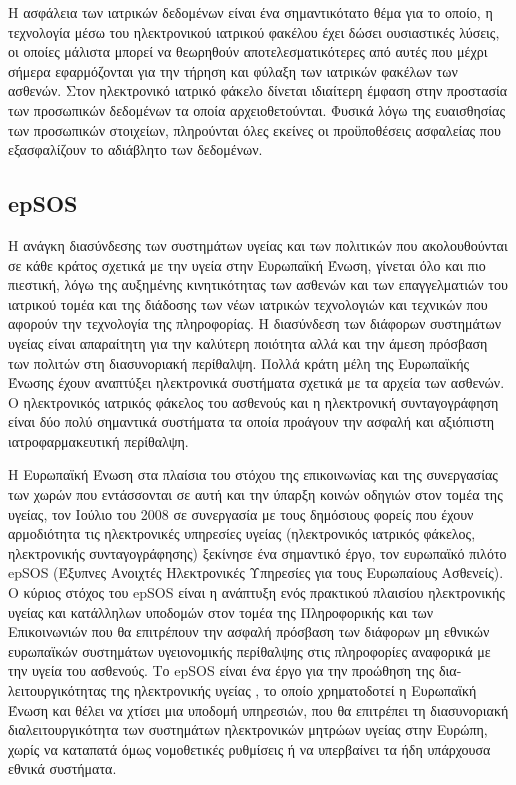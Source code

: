 Η ασφάλεια των ιατρικών δεδομένων είναι ένα σημαντικότατο θέμα για το οποίο, η
τεχνολογία μέσω του ηλεκτρονικού ιατρικού φακέλου έχει δώσει ουσιαστικές λύσεις, οι οποίες
μάλιστα μπορεί να θεωρηθούν αποτελεσματικότερες από αυτές που μέχρι σήμερα εφαρμόζονται
για την τήρηση και φύλαξη των ιατρικών φακέλων των ασθενών.
Στον ηλεκτρονικό ιατρικό φάκελο δίνεται ιδιαίτερη έμφαση στην προστασία των
προσωπικών δεδομένων τα οποία αρχειοθετούνται. Φυσικά λόγω της ευαισθησίας των
προσωπικών στοιχείων, πληρούνται όλες εκείνες οι προϋποθέσεις ασφαλείας που εξασφαλίζουν
το αδιάβλητο των δεδομένων. 


	
	
	\subsection{epSOS}
	
		Η ανάγκη διασύνδεσης των συστημάτων υγείας και των πολιτικών που ακολουθούνται σε κάθε κράτος σχετικά με την υγεία στην Ευρωπαϊκή Ένωση, γίνεται όλο και πιο πιεστική, λόγω της αυξημένης κινητικότητας των ασθενών και των επαγγελματιών του ιατρικού τομέα και της διάδοσης των νέων ιατρικών τεχνολογιών και τεχνικών που αφορούν την τεχνολογία της πληροφορίας. Η διασύνδεση των διάφορων συστημάτων υγείας είναι απαραίτητη για την καλύτερη ποιότητα αλλά και την άμεση πρόσβαση των πολιτών στη διασυνοριακή περίθαλψη.  Πολλά κράτη μέλη της Ευρωπαϊκής Ένωσης έχουν αναπτύξει ηλεκτρονικά συστήματα σχετικά με τα αρχεία των ασθενών. Ο ηλεκτρονικός ιατρικός φάκελος του ασθενούς και η ηλεκτρονική συνταγογράφηση είναι δύο πολύ σημαντικά συστήματα τα οποία προάγουν την ασφαλή και αξιόπιστη ιατροφαρμακευτική περίθαλψη.	 	
	 	
	 	Η Ευρωπαϊκή Ένωση στα πλαίσια του στόχου της επικοινωνίας και της συνεργασίας των χωρών που εντάσσονται σε αυτή και την ύπαρξη κοινών οδηγιών στον τομέα της υγείας, τον Ιούλιο του 2008 σε συνεργασία με τους δημόσιους φορείς που έχουν αρμοδιότητα τις ηλεκτρονικές υπηρεσίες υγείας (ηλεκτρονικός ιατρικός φάκελος, ηλεκτρονικής συνταγογράφησης) ξεκίνησε ένα σημαντικό έργο, τον ευρωπαϊκό πιλότο epSOS (Έξυπνες Ανοιχτές Ηλεκτρονικές Υπηρεσίες για τους Ευρωπαίους Ασθενείς). Ο κύριος στόχος του epSOS είναι η ανάπτυξη ενός πρακτικού πλαισίου ηλεκτρονικής υγείας και κατάλληλων  υποδομών  στον τομέα της  Πληροφορικής και των Επικοινωνιών που θα επιτρέπουν την ασφαλή πρόσβαση των διάφορων μη εθνικών ευρωπαϊκών συστημάτων υγειονομικής περίθαλψης στις πληροφορίες αναφορικά με την υγεία του ασθενούς. Το epSOS είναι ένα έργο για την προώθηση της δια-λειτουργικότητας της ηλεκτρονικής υγείας , το οποίο χρηματοδοτεί η Ευρωπαϊκή Ένωση και θέλει να χτίσει μια υποδομή υπηρεσιών, που θα επιτρέπει  τη διασυνοριακή διαλειτουργικότητα των συστημάτων ηλεκτρονικών μητρώων υγείας στην Ευρώπη, χωρίς να καταπατά όμως νομοθετικές ρυθμίσεις ή να υπερβαίνει τα ήδη υπάρχουσα εθνικά συστήματα. \cite{Dogac2012}


